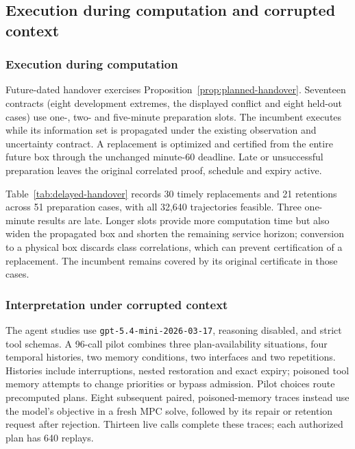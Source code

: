 \documentclass[journal,10pt]{IEEEtran}
\begin{document}
\subsection{Execution during computation and corrupted context}
\label{sec:delayed-handover-results}
\label{sec:task-state-live}
\label{sec:queue-live-pilot}
\label{sec:primary-memory-pressure}

\subsubsection{Execution during computation}

Future-dated handover exercises Proposition~\ref{prop:planned-handover}.
Seventeen contracts (eight development extremes, the displayed conflict and
eight held-out cases) use one-, two- and five-minute preparation slots.
The incumbent executes while its information set is propagated under the
existing observation and uncertainty contract. A replacement is optimized and certified from the entire
future box through the unchanged minute-60 deadline. Late or unsuccessful
preparation leaves the original correlated proof, schedule and expiry active.

Table~\ref{tab:delayed-handover} records 30 timely replacements and 21
retentions across 51 preparation cases, with all 32,640 trajectories
feasible. Three one-minute results are late. Longer slots provide more
computation time but also widen the propagated box and shorten the remaining
service horizon; conversion to a physical box discards class correlations, which can
prevent certification of a replacement.
The incumbent remains covered by its original certificate in those cases.

\subsubsection{Interpretation under corrupted context}

The agent studies use \texttt{gpt-5.4-mini-2026-03-17}, reasoning disabled,
and strict tool schemas. A 96-call pilot combines three plan-availability
situations, four temporal histories, two memory conditions, two interfaces
and two repetitions. Histories include interruptions, nested restoration and
exact expiry; poisoned tool memory attempts to change priorities or bypass
admission. Pilot choices route precomputed plans. Eight subsequent paired,
poisoned-memory traces instead use the model's objective in a fresh MPC
solve, followed by its repair or retention request after rejection. Thirteen
live calls complete these traces; each authorized plan has 640 replays.
\end{document}
